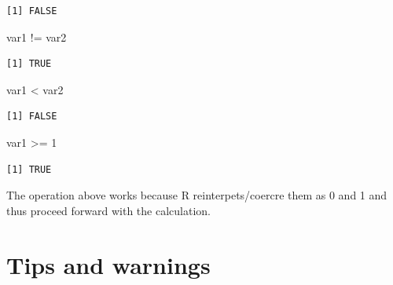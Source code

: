 \documentclass[
  letterpaper,
  DIV=11,
  numbers=noendperiod]{scrreprt}
\newenvironment{Shaded}{\begin{snugshade}}{\end{snugshade}}
\newcommand{\DecValTok}[1]{\textcolor[rgb]{0.68,0.00,0.00}{#1}}
\newcommand{\NormalTok}[1]{\textcolor[rgb]{0.00,0.23,0.31}{#1}}
\newcommand{\SpecialCharTok}[1]{\textcolor[rgb]{0.37,0.37,0.37}{#1}}
\begin{document}
\begin{verbatim}
[1] FALSE
\end{verbatim}

\begin{Shaded}
\begin{Highlighting}[]
\NormalTok{var1 }\SpecialCharTok{!=}\NormalTok{ var2}
\end{Highlighting}
\end{Shaded}

\begin{verbatim}
[1] TRUE
\end{verbatim}

\begin{Shaded}
\begin{Highlighting}[]
\NormalTok{var1 }\SpecialCharTok{\textless{}}\NormalTok{ var2}
\end{Highlighting}
\end{Shaded}

\begin{verbatim}
[1] FALSE
\end{verbatim}

\begin{Shaded}
\begin{Highlighting}[]
\NormalTok{var1 }\SpecialCharTok{\textgreater{}=} \DecValTok{1}
\end{Highlighting}
\end{Shaded}

\begin{verbatim}
[1] TRUE
\end{verbatim}

The operation above works because R reinterpets/coercre them as 0 and 1
and thus proceed forward with the calculation.

\section*{Tips and warnings}\label{tips-and-warnings-25}

\end{document}
